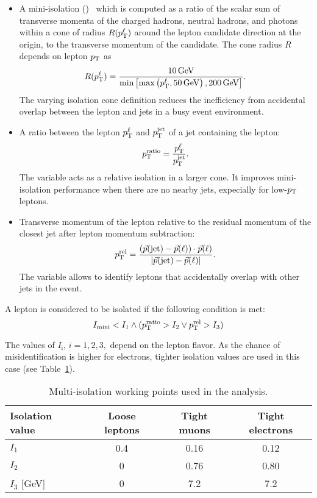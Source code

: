 \begin{itemize}
	\item A mini-isolation (\miniIso)~\cite{Rehermann:2010vq} which is computed as a ratio of the scalar sum of transverse momenta of the charged hadrons, neutral hadrons, and photons within a cone of radius $R (p_{\mathrm{T}}^\ell)$ around the lepton candidate direction at the origin, to the transverse momentum of the candidate. The cone radius $R$depends on lepton $p_{\mathrm{T}}$ as 
		\begin{equation}
			R(p_{\mathrm{T}}^\ell) = \dfrac{10\,\text{Ge\hspace{-.08em}V}}{\min\left[\max\left(p_{\mathrm{T}}^\ell, 50\,\text{Ge\hspace{-.08em}V}\right), 200\,\text{Ge\hspace{-.08em}V}\right]}.
		\end{equation}
		The varying isolation cone definition reduces the inefficiency from accidental overlap between the lepton and jets in a busy event environment.
	\item A ratio between the lepton $p_{\mathrm{T}}^\ell$ and $p_{\mathrm{T}}^\text{jet}$ of a jet containing the lepton: 
		\begin{equation}
			p_{\mathrm{T}}^\text{ratio} = \dfrac{p_{\mathrm{T}}^\ell}{p_{\mathrm{T}}^\text{jet}}.
		\end{equation}
		The \ptRatio variable acts as a relative isolation in a larger cone. It improves mini-isolation performance when there are no nearby jets, expecially for low-$p_{\mathrm{T}}$ leptons. %
	\item Transverse momentum of the lepton relative to the residual momentum of the closest jet after lepton momentum subtraction:
	  \begin{equation}
		p_{\mathrm{T}}^\text{rel}=\frac{(\vec{p}(\text{jet})-\vec{p}(\ell))\cdot \vec{p}(\ell) }{|\vec{p}(\text{jet})-\vec{p}(\ell)|}.
	  \end{equation}
	The \ptRel variable allows to identify leptons that accidentally overlap with other jets in the event.
\end{itemize}

A lepton is considered to be isolated if the following condition is met:
\begin{equation}
	I_\text{mini} < I_1 \wedge ( p_{\mathrm{T}}^\text{ratio} > I_2 \vee p_{\mathrm{T}}^\text{rel} > I_3 )
\end{equation}

The values of $I_\text{i}$, $i = 1,2,3,$ depend on the lepton flavor. As the chance of misidentification is higher for electrons, tighter isolation values are used in this case (see Table~\ref{tab:isoWPs}). 
\begin{table}[h]
\centering
\caption{Multi-isolation working points used in the analysis.} \label{tab:isoWPs}
\begin{tabular}{l ccc}
\hline\hline
Isolation value & Loose leptons  & Tight muons & Tight electrons  \\
\hline
$I_1$ & 0.4 & 0.16 & 0.12 \\
$I_2$ & 0 & 0.76 & 0.80 \\
$I_3$ [GeV] & 0 & 7.2 & 7.2 \\
\hline
\end{tabular}
\end{table}

